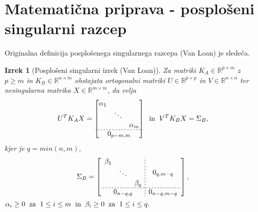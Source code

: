 \documentclass[mat1]{article}
\newtheorem{izrek}{Izrek}
\begin{document}
\section{Matematična priprava - posplošeni singularni razcep}
Originalna definicija posplošenega singularnega razcepa (Van Loan) je sledeča.
\begin{izrek}[Posplošeni singularni izrek (Van Loan)]
\label{izrek:SVD} Za matriki $K_A \in \mathbb{R}^{p \times m}$ z $p \geq m$ in $K_B \in \mathbb{R}^{n \times m}$ obstajata ortogonalni matriki $U \in \mathbb{R}^{p \times p}$ in $V \in \mathbb{R}^{n \times n}$ ter nesingularna matrika $X \in \mathbb{R}^{m \times m}$, da velja 
$$ U^T K_A X = 
\begin{bmatrix}
\begin{matrix}
\alpha_1 & & \\
 & \ddots & \\
 & & \alpha_m
\end{matrix} \\ \hdashline[2pt/2pt]
0_{p-m, m}
\end{bmatrix} 
\hspace{2mm} \text{in} \hspace{2mm}
 V^T K_B X = 
\Sigma_B \text{,}
$$ kjer je $q = min(n,m) \text{,}$
\begin{gather*}
\Sigma_B = 
\left[
\begin{array}{c;{2pt/2pt}c}
\begin{matrix}
\beta_1 & & \\
 & \ddots & \\
 & & \beta_q
\end{matrix} & 0_{q, m - q}
 \\ \hdashline[2pt/2pt]
0_{n-q, q} & 0_{n-q, m-q}
\end{array} \right] \text{,} 
\end{gather*} %
$
\alpha_i \geq 0 \hspace{2mm} \text{za} \hspace{2mm}
 1 \leq i \leq m \hspace{2mm} \text{in} \hspace{2mm}
  \beta_i \geq 0 \hspace{2mm} \text{za} \hspace{2mm} 1 \leq i \leq q
\text{.}
$
\end{izrek}
\end{document}
